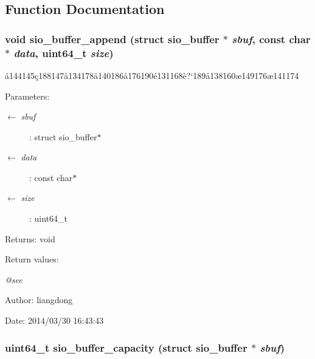 \subsection{Function Documentation}
\subsubsection{\setlength{\rightskip}{0pt plus 5cm}void sio\_\-buffer\_\-append (struct sio\_\-buffer $\ast$ {\em sbuf}, const char $\ast$ {\em data}, uint64\_\-t {\em size})}\label{sio__buffer_8h_a2}


\aa{}144145\c{c}188147\aa{}134178\aa{}140186\aa{}176190\'{e}131168\`{e}?`189\aa{}138160\ae{}149176\ae{}141174 

\begin{Desc}
\item[Parameters:]
\begin{description}
\item[\mbox{$\leftarrow$} {\em sbuf}]: struct sio\_\-buffer$\ast$ \item[\mbox{$\leftarrow$} {\em data}]: const char$\ast$ \item[\mbox{$\leftarrow$} {\em size}]: uint64\_\-t \end{description}
\end{Desc}
\begin{Desc}
\item[Returns:]void \end{Desc}
\begin{Desc}
\item[Return values:]
\begin{description}
\item[{\em @see}]\end{description}
\end{Desc}
\begin{Desc}
\item[Author:]liangdong \end{Desc}
\begin{Desc}
\item[Date:]2014/03/30 16:43:43 \end{Desc}
\subsubsection{\setlength{\rightskip}{0pt plus 5cm}uint64\_\-t sio\_\-buffer\_\-capacity (struct sio\_\-buffer $\ast$ {\em sbuf})}\label{sio__buffer_8h_a7}


